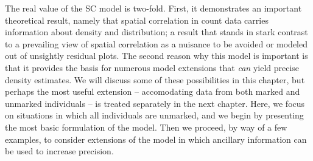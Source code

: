 The real value of the SC model is two-fold. First, it demonstrates
an important theoretical result, namely
that spatial correlation in
count data carries information about density and distribution; a
result that %
stands in stark contrast to a prevailing view of
spatial correlation as a nuisance to be avoided or modeled out of unsightly
residual plots. The second reason why this model is important is that
it provides the basis for numerous model extensions that \textit{can}
yield precise density estimates. %
We will discuss some of
these possibilities in this chapter, but
perhaps the most useful extension -- accomodating %
data from both marked and unmarked
individuals -- is treated separately in the next chapter. Here, we focus
on situations in which all individuals are unmarked, and
we begin by presenting the most basic formulation of the model. Then we proceed, by
way of a few examples, to consider extensions of the model in which
ancillary information can be used to increase precision.

